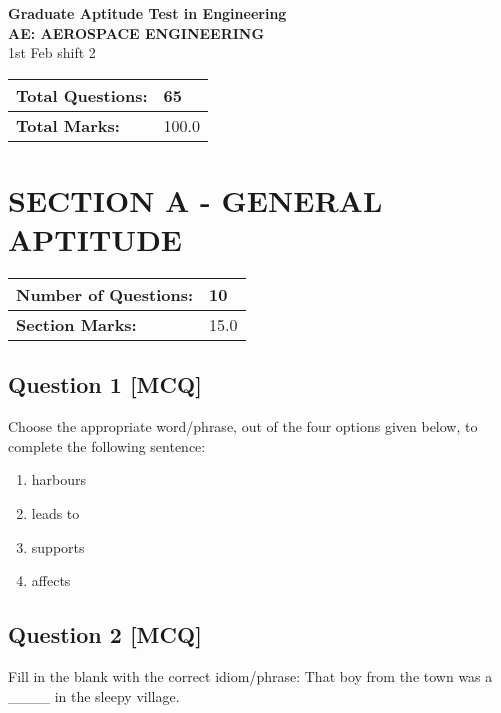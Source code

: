 \documentclass[12pt,a4paper]{article}
\begin{document}
\begin{center}
{\LARGE \textbf{Graduate Aptitude Test in Engineering}}\\[0.5cm]
{\Large \textbf{AE: AEROSPACE ENGINEERING}}\\[0.3cm]
{\large 1st Feb shift 2}\\[0.5cm]

\begin{tabular}{|l|l|}
\hline
\textbf{Total Questions:} & 65 \\
\hline
\textbf{Total Marks:} & 100.0 \\
\hline
\end{tabular}
\end{center}

\vspace{1cm}



\section*{SECTION A - GENERAL APTITUDE}
\begin{center}
\begin{tabular}{|l|l|}
\hline
\textbf{Number of Questions:} & 10 \\
\hline
\textbf{Section Marks:} & 15.0 \\
\hline
\end{tabular}
\end{center}

\subsection*{Question 1 [MCQ]}
Choose the appropriate word/phrase, out of the four options given below, to complete the following sentence:
\begin{enumerate}[label=(\alph*)]
\item harbours
\item leads to  
\item supports
\item affects
\end{enumerate}

\subsection*{Question 2 [MCQ]}
Fill in the blank with the correct idiom/phrase:
That boy from the town was a \_\_\_\_ in the sleepy village.
 
\end{document}
